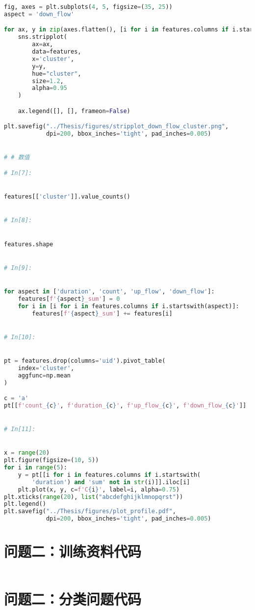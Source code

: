 \documentclass[withoutpreface,bwprint]{cumcmthesis}
\begin{document}
\begin{appendices}
\begin{lstlisting}[language=Python]
fig, axes = plt.subplots(4, 5, figsize=(35, 25))
aspect = 'down_flow'

for ax, y in zip(axes.flatten(), [i for i in features.columns if i.startswith(aspect)]):
    sns.stripplot(
        ax=ax,
        data=features,
        x='cluster',
        y=y,
        hue="cluster",
        size=1.2,
        alpha=0.95
    )

    ax.legend([], [], frameon=False)

plt.savefig("../Thesis/figures/stripplot_down_flow_cluster.png",
            dpi=200, bbox_inches='tight', pad_inches=0.005)


# # 数值

# In[7]:


features[['cluster']].value_counts()


# In[8]:


features.shape


# In[9]:


for aspect in ['duration', 'count', 'up_flow', 'down_flow']:
    features[f'{aspect}_sum'] = 0
    for i in [i for i in features.columns if i.startswith(aspect)]:
        features[f'{aspect}_sum'] += features[i]


# In[10]:


pt = features.drop(columns='uid').pivot_table(
    index='cluster',
    aggfunc=np.mean
)

c = 'a'
pt[[f'count_{c}', f'duration_{c}', f'up_flow_{c}', f'down_flow_{c}']]


# In[11]:


x = range(20)
plt.figure(figsize=(10, 5))
for i in range(5):
    y = pt[[i for i in features.columns if i.startswith(
        'duration') and 'sum' not in str(i)]].iloc[i]
    plt.plot(x, y, c=f'C{i}', label=i, alpha=0.75)
plt.xticks(range(20), list("abcdefghijklmnopqrst"))
plt.legend()
plt.savefig("../Thesis/figures/plot_profile.pdf",
            dpi=200, bbox_inches='tight', pad_inches=0.005)
    \end{lstlisting}

    \section{问题二：训练资料代码}

    \begin{lstlisting}[language=Python]

    \end{lstlisting}

    \section{问题二：分类问题代码}


\end{appendices}
\end{document}

